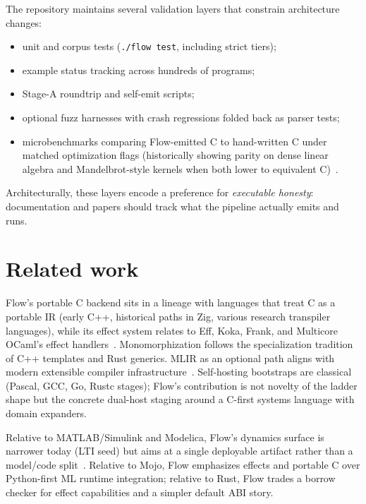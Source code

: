 \documentclass[11pt,a4paper]{article}
\theoremstyle{remark}
\begin{document}
The repository maintains several validation layers that constrain architecture
changes:

\begin{itemize}[leftmargin=*]
  \item unit and corpus tests (\texttt{./flow test}, including strict tiers);
  \item example status tracking across hundreds of programs;
  \item Stage-A roundtrip and self-emit scripts;
  \item optional fuzz harnesses with crash regressions folded back as parser
        tests;
  \item microbenchmarks comparing Flow-emitted C to hand-written C under matched
        optimization flags (historically showing parity on dense linear algebra
        and Mandelbrot-style kernels when both lower to equivalent C)~\cite{flow-cmp}.
\end{itemize}

Architecturally, these layers encode a preference for \emph{executable
honesty}: documentation and papers should track what the pipeline actually
emits and runs.

\section{Related work}
\label{sec:related}

Flow's portable C backend sits in a lineage with languages that treat C as a
portable IR (early C++, historical paths in Zig, various research transpiler
languages), while its effect system relates to Eff, Koka, Frank, and Multicore
OCaml's effect handlers~\cite{bauer-pretnar,leijen-koka,lindley-frank,ocaml-effects}.
Monomorphization follows the specialization tradition of C++ templates and Rust
generics. MLIR as an optional path aligns with modern extensible compiler
infrastructure~\cite{mlir}. Self-hosting bootstraps are classical
(Pascal, GCC, Go, Rustc stages); Flow's contribution is not novelty of the
ladder shape but the concrete dual-host staging around a C-first systems
language with domain expanders.

Relative to MATLAB/Simulink and Modelica, Flow's dynamics surface is narrower
today (LTI seed) but aims at a single deployable artifact rather than a
model/code split~\cite{flow-cmp}. Relative to Mojo, Flow emphasizes effects and
portable C over Python-first ML runtime integration; relative to Rust, Flow
trades a borrow checker for effect capabilities and a simpler default ABI
story.
\end{document}
